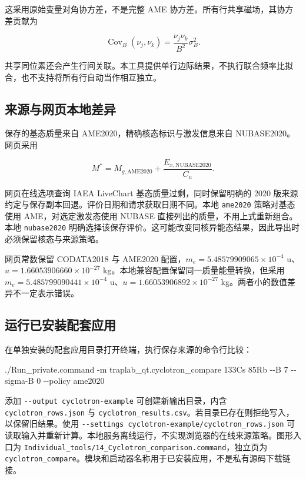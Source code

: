 \documentclass[
  aps,
  onecolumn,
  11pt]{revtex4-2}
\newenvironment{Shaded}{}{}
\newcommand{\AttributeTok}[1]{\textcolor[rgb]{0.49,0.56,0.16}{#1}}
\newcommand{\ExtensionTok}[1]{#1}
\newcommand{\NormalTok}[1]{#1}
\begin{document}
这采用原始变量对角协方差，不是完整 AME
协方差。所有行共享磁场，其协方差贡献为

\[\operatorname{Cov}_B(\nu_j,\nu_k)=\frac{\nu_j\nu_k}{B^2}\sigma_B^2.\]

共享同位素还会产生行间关联。本工具提供单行边际结果，不执行联合频率比拟合，也不支持将所有行自动当作相互独立。

\subsection{来源与网页本地差异}\label{ux6765ux6e90ux4e0eux7f51ux9875ux672cux5730ux5deeux5f02}

保存的基态质量来自 AME2020，精确核态标识与激发信息来自
NUBASE2020。网页采用

\[M^*=M_{g,\mathrm{AME2020}}+\frac{E_{x,\mathrm{NUBASE2020}}}{C_u}.\]

网页在线选项查询 IAEA LiveChart 基态质量过剩，同时保留明确的 2020
版来源约定与保存副本回退。评价日期和请求获取日期不同。本地
\texttt{ame2020} 策略对基态使用 AME，对选定激发态使用 NUBASE
直接列出的质量，不用上式重新组合。本地 \texttt{nubase2020}
明确选择该保存评价。这可能改变同核异能态结果，因此导出时必须保留核态与来源策略。

网页常数保留 CODATA2018 与 AME2020
配置，\(m_e=5.48579909065\times10^{-4}\)
u、\(u=1.66053906660\times10^{-27}\)
kg。本地兼容配置保留同一质量能量转换，但采用
\(m_e=5.485799090441\times10^{-4}\) u、\(u=1.66053906892\times10^{-27}\)
kg。两者小的数值差异不一定表示错误。

\subsection{运行已安装配套应用}\label{ux8fd0ux884cux5df2ux5b89ux88c5ux914dux5957ux5e94ux7528}

在单独安装的配套应用目录打开终端，执行保存来源的命令行比较：

\begin{Shaded}
\begin{Highlighting}[]
\ExtensionTok{./Run\_private.command} \AttributeTok{{-}m}\NormalTok{ traplab\_qt.cyclotron\_compare 133Cs 85Rb }\AttributeTok{{-}{-}B}\NormalTok{ 7 }\AttributeTok{{-}{-}sigma{-}B}\NormalTok{ 0 }\AttributeTok{{-}{-}policy}\NormalTok{ ame2020}
\end{Highlighting}
\end{Shaded}

添加 \texttt{-\/-output\ cyclotron-example} 可创建新输出目录，内含
\texttt{cyclotron\_rows.json} 与
\texttt{cyclotron\_results.csv}。若目录已存在则拒绝写入，以保留旧结果。使用
\texttt{-\/-settings\ cyclotron-example/cyclotron\_rows.json}
可读取输入并重新计算。本地服务离线运行，不实现浏览器的在线来源策略。图形入口为
\texttt{Individual\_tools/14\_Cyclotron\_comparison.command}，独立页为
\texttt{cyclotron\_compare}。模块和启动器名称用于已安装应用，不是私有源码下载链接。
\end{document}
